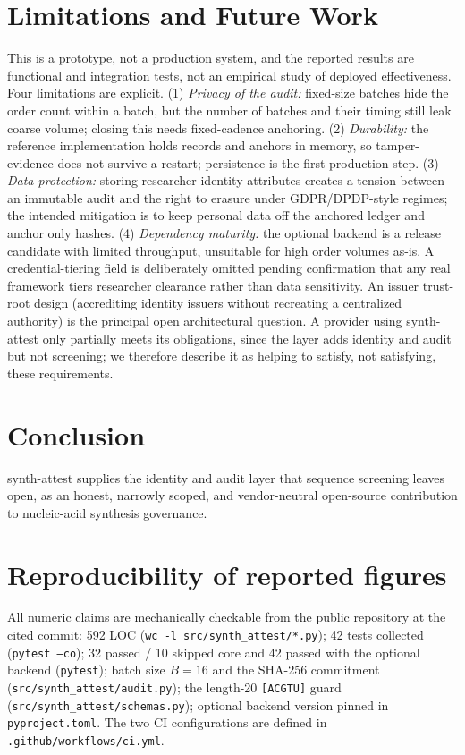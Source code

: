 \documentclass[conference]{IEEEtran}
\begin{document}
\section{Limitations and Future Work}
\label{sec:limits}
This is a prototype, not a production system, and the reported results are functional and
integration tests, not an empirical study of deployed effectiveness. Four limitations are
explicit. (1) \textit{Privacy of the audit:} fixed-size batches hide the order count within a
batch, but the number of batches and their timing still leak coarse volume; closing this needs
fixed-cadence anchoring. (2) \textit{Durability:} the reference implementation holds records and
anchors in memory, so tamper-evidence does not survive a restart; persistence is the first
production step. (3) \textit{Data protection:} storing researcher identity attributes creates a
tension between an immutable audit and the right to erasure under GDPR/DPDP-style regimes; the
intended mitigation is to keep personal data off the anchored ledger and anchor only hashes. (4)
\textit{Dependency maturity:} the optional backend is a release candidate with limited
throughput, unsuitable for high order volumes as-is. A credential-tiering field is deliberately
omitted pending confirmation that any real framework tiers researcher clearance rather than data
sensitivity. An issuer trust-root design (accrediting identity issuers without recreating a
centralized authority) is the principal open architectural question. A provider using
synth-attest only partially meets its obligations, since the layer adds identity and audit but not
screening; we therefore describe it as helping to satisfy, not satisfying, these requirements.

\section{Conclusion}
synth-attest supplies the identity and audit layer that sequence screening leaves open, as an
honest, narrowly scoped, and vendor-neutral open-source contribution to nucleic-acid synthesis
governance.

\appendices
\section{Reproducibility of reported figures}
All numeric claims are mechanically checkable from the public repository at the cited commit:
592 LOC (\texttt{wc -l src/synth\_attest/*.py}); 42 tests collected (\texttt{pytest --co});
32 passed / 10 skipped core and 42 passed with the optional backend (\texttt{pytest});
batch size $B{=}16$ and the SHA-256 commitment (\texttt{src/synth\_attest/audit.py}); the
length-20 \texttt{[ACGTU]} guard (\texttt{src/synth\_attest/schemas.py}); optional backend
version pinned in \texttt{pyproject.toml}. The two CI configurations are defined in
\texttt{.github/workflows/ci.yml}.
\end{document}
